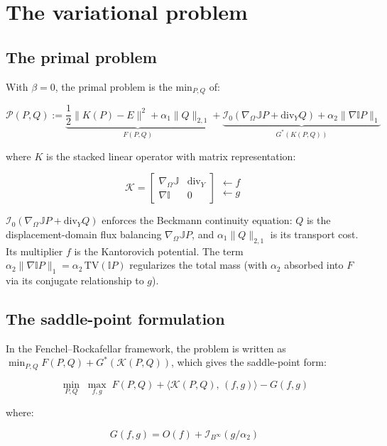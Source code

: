 \documentclass{article}
\begin{document}
\section*{The variational problem}

\subsection*{The primal problem}

With $\beta = 0$, the primal problem is the $\mathrm{min}_{P,Q}$ of:

$$\mathcal{P}(P,Q) := \underbrace{\frac{1}{2}\|K(P)-E\|^2 + \alpha_1\|Q\|_{2,1}}_{F(P,Q)} + \underbrace{\mathcal{I}_0(\nabla_\Omega\mathbb{J}P + \mathrm{div}_Y Q) + {\alpha_2}\|\nabla\mathbb{I}P\|_1}_{G^*(K(P,Q))}$$

where $K$ is the stacked linear operator with matrix representation:

$$\mathcal{K} = \begin{bmatrix} \nabla_\Omega\mathbb{J} & \mathrm{div}_Y \\ \nabla\mathbb{I} & 0 \end{bmatrix} \begin{matrix} \leftarrow f \\ \leftarrow g \end{matrix}$$

$\mathcal{I}_0(\nabla_\Omega\mathbb{J}P + \mathrm{div}_Y Q)$ enforces the Beckmann continuity equation: $Q$ is the displacement-domain flux balancing $\nabla_\Omega \mathbb{J}P$, and $\alpha_1\|Q\|_{2,1}$ is its transport cost. Its multiplier $f$ is the Kantorovich potential. The term ${\alpha_2}\|\nabla\mathbb{I}P\|_1 = \alpha_2\,\mathrm{TV}(\mathbb{I}P)$ regularizes the total mass (with $\alpha_2$ absorbed into $F$ via its conjugate relationship to $g$).

\subsection*{The saddle-point formulation}

In the Fenchel–Rockafellar framework, the problem is written as $\min_{P,Q} F(P,Q) + G^*(\mathcal{K}(P,Q))$, which gives the saddle-point form:

$$\min_{P,Q}\;\max_{f,g}\; F(P,Q) + \langle \mathcal{K}(P,Q),\,(f,g)\rangle - G(f,g)$$

where:

$$G(f,g) = O(f) + \mathcal{I}_{B^\infty}(g/\alpha_2)$$
\end{document}
